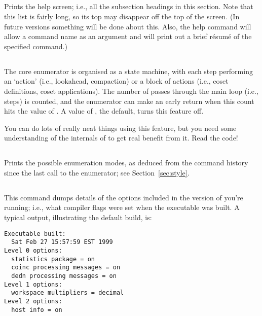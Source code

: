 \subsection{}
\label{cmd:help}

Prints the help screen; i.e., all the subsection headings in this section.
Note that this list is fairly long, so its top may disappear off the top 
  of the screen.
(In future versions something will be done about this.
Also, the help command will allow a command name as an argument and will
  print out a brief r\'{e}sum\'{e} of the specified command.)

\subsection{}
\label{cmd:loop limit}

The core enumerator is organised as a state machine, with each step
  performing an `action' (i.e., lookahead, compaction) or a block of
  actions (i.e.,  coset definitions,  coset applications).
The number of passes through the main loop (i.e., steps) is counted, and
  the enumerator can make an early return when this count hits the
  value of .
A value of , the default, turns this feature off.

You can do lots of really neat things using this feature, but you need
  some understanding of the internals of {\ace} to get real benefit from
  it.
Read the code!

\subsection{}
\label{cmd:mode}

Prints the possible enumeration modes, as deduced from the command history
  since the last call to the enumerator; see Section~\ref{sec:style}.

\subsection{}
\label{cmd:options}

This command dumps details of the options included in the version of {\ace}
  you're running; i.e., what compiler flags were set when the executable
  was built.
A typical output, illustrating the default build, is:

\bv\begin{verbatim}
Executable built:
  Sat Feb 27 15:57:59 EST 1999
Level 0 options:
  statistics package = on
  coinc processing messages = on
  dedn processing messages = on
Level 1 options:
  workspace multipliers = decimal
Level 2 options:
  host info = on
\end{verbatim}\ev

